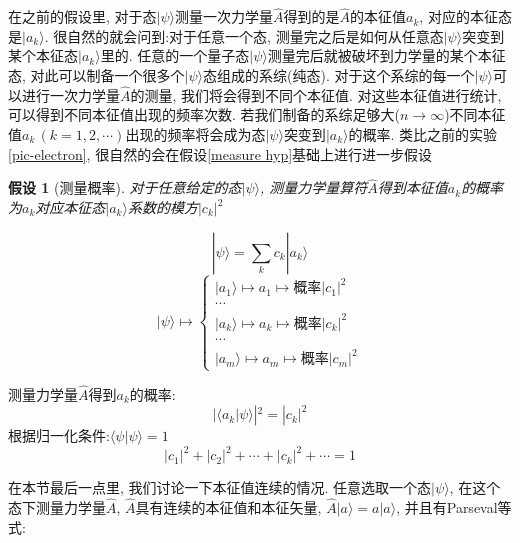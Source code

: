 \documentclass[a4paper,11pt]{book}
\newtheorem{hypothesis}{假设}[section]
\begin{document}
在之前的假设里, 对于态$|\psi\rangle$测量一次力学量$\hat{A}$得到的是$\hat{A}$的本征值$a_k$, 对应的本征态是$|a_k\rangle$. 很自然的就会问到:对于任意一个态, 测量完之后是如何从任意态$|\psi\rangle$突变到某个本征态$|a_k\rangle$里的. 任意的一个量子态$|\psi\rangle$测量完后就被破坏到力学量的某个本征态, 对此可以制备一个很多个$|\psi\rangle$态组成的系综(纯态). 对于这个系综的每一个$|\psi\rangle$可以进行一次力学量$\hat{A}$的测量, 我们将会得到不同个本征值. 对这些本征值进行统计, 可以得到不同本征值出现的频率次数. 若我们制备的系综足够大($n\to\infty$)不同本征值$a_k\,(k=1,2,\cdots)$出现的频率将会成为态$|\psi\rangle$突变到$|a_k\rangle$的概率. 类比之前的实验\ref{pic-electron}, 很自然的会在假设\ref{measure hyp}基础上进行进一步假设
\begin{hypothesis}[测量概率]
  对于任意给定的态$|\psi\rangle$, 测量力学量算符$\hat{A}$得到本征值$a_k$的概率为$a_k$对应本征态$|a_k\rangle$系数的模方$|c_k|^2$
\end{hypothesis}
\begin{minipage}[h]{0.5\linewidth}
\begin{equation*}
  |\psi\rangle=\sum_{k}c_k|a_k\rangle
\end{equation*}
\begin{equation*}
  |\psi\rangle\longmapsto\begin{cases}
                           |a_1\rangle\longmapsto a_1\longmapsto\text{概率$|c_1|^2$}\\
                           \cdots\\
                           |a_k\rangle\longmapsto a_k\longmapsto\text{概率$|c_k|^2$}\\
                           \cdots\\
                           |a_m\rangle\longmapsto a_m\longmapsto\text{概率$|c_m|^2$}
                         \end{cases}
\end{equation*}
\end{minipage}
\begin{minipage}[h]{0.5\linewidth}
  测量力学量$\hat{A}$得到$a_k$的概率:
  \begin{equation*}
    |\langle a_k|\psi\rangle|^2=|c_k|^2
  \end{equation*}
  根据归一化条件:$\langle\psi|\psi\rangle=1$
  \begin{equation*}
    |c_1|^2+|c_2|^2+\cdots+|c_k|^2+\cdots=1
  \end{equation*}
\end{minipage}
在本节最后一点里, 我们讨论一下本征值连续的情况. 任意选取一个态$|\psi\rangle$, 在这个态下测量力学量$\hat{A}$, $\hat{A}$具有连续的本征值和本征矢量, $\hat{A}|a\rangle=a|a\rangle$, 并且有Parseval等式:
\end{document}
